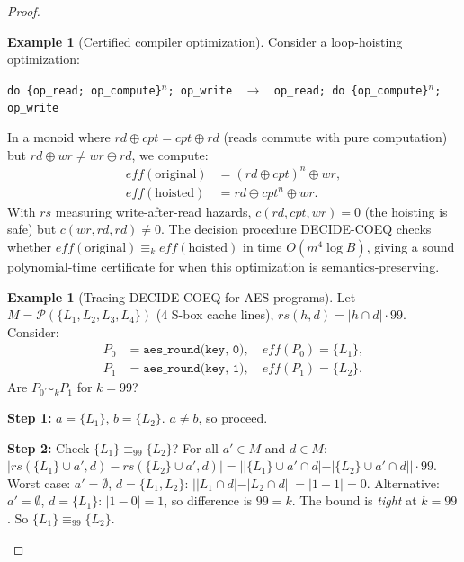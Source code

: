 \documentclass[acmsmall,sigplan,anonymous,review,screen]{acmart}
\theoremstyle{plain}
\theoremstyle{definition}
\newtheorem{example}[theorem]{Example}
\newcommand{\rs}{\mathit{rs}}
\begin{document}
\begin{proof}
\begin{example}[Certified compiler optimization]
\label{ex:optim}
  Consider a loop-hoisting optimization:
  \begin{center}
    \texttt{do \{op\_read; op\_compute\}$^n$; op\_write}
    $\;\;\longrightarrow\;\;$
    \texttt{op\_read; do \{op\_compute\}$^n$; op\_write}
  \end{center}
  In a monoid where $\mathit{rd} \oplus \mathit{cpt} = \mathit{cpt} \oplus \mathit{rd}$
  (reads commute with pure computation) but
  $\mathit{rd} \oplus \mathit{wr} \neq \mathit{wr} \oplus \mathit{rd}$, we compute:
  \begin{align*}
    \mathit{eff}(\text{original}) &= (\mathit{rd} \oplus \mathit{cpt})^n \oplus \mathit{wr}, \\
    \mathit{eff}(\text{hoisted})  &= \mathit{rd} \oplus \mathit{cpt}^n \oplus \mathit{wr}.
  \end{align*}
  With $\rs$ measuring write-after-read hazards,
  $c(\mathit{rd}, \mathit{cpt}, \mathit{wr}) = 0$ (the hoisting is safe)
  but $c(\mathit{wr}, \mathit{rd}, \mathit{rd}) \neq 0$.
  The decision procedure DECIDE-COEQ checks whether
  $\mathit{eff}(\text{original}) \equiv_k \mathit{eff}(\text{hoisted})$
  in time $O(m^4 \log B)$, giving a sound polynomial-time certificate for
  when this optimization is semantics-preserving.
\end{example}

\begin{example}[Tracing DECIDE-COEQ for AES programs]
\label{ex:decide-trace}
  Let $M = \mathcal{P}(\{L_1, L_2, L_3, L_4\})$ (4 S-box cache lines),
  $\rs(h, d) = |h \cap d| \cdot 99$.  Consider:
  \begin{align*}
    P_0 &= \texttt{aes\_round(key, 0)}, \quad \mathit{eff}(P_0) = \{L_1\}, \\
    P_1 &= \texttt{aes\_round(key, 1)}, \quad \mathit{eff}(P_1) = \{L_2\}.
  \end{align*}
  Are $P_0 \sim_k P_1$ for $k = 99$?

  \textbf{Step 1:} $a = \{L_1\}$, $b = \{L_2\}$.  $a \neq b$, so proceed.

  \textbf{Step 2:} Check $\{L_1\} \equiv_{99} \{L_2\}$?
  For all $a' \in M$ and $d \in M$:
  $|\rs(\{L_1\} \cup a', d) - \rs(\{L_2\} \cup a', d)|
  = ||\{L_1\} \cup a' \cap d| - |\{L_2\} \cup a' \cap d|| \cdot 99$.
  Worst case: $a' = \emptyset$, $d = \{L_1, L_2\}$:
  $||L_1 \cap d| - |L_2 \cap d|| = |1 - 1| = 0$.
  Alternative: $a' = \emptyset$, $d = \{L_1\}$:
  $|1 - 0| = 1$, so difference is $99 = k$.
  The bound is \emph{tight} at $k = 99$.  So $\{L_1\} \equiv_{99} \{L_2\}$.


\end{example}
\end{proof}
\end{document}
